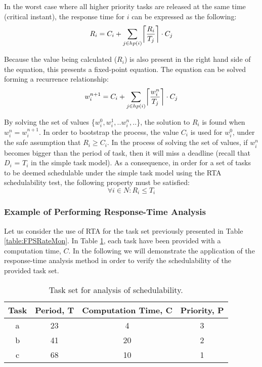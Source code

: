 In the worst case where all higher priority tasks are released at the same time (critical instant), the response time for $i$ can be expressed as the following:
\begin{equation}
	R_i = C_i + \sum_{j\in hp(i)} \ceil[\bigg]{\frac{R_i}{T_j}} \cdot C_j
\end{equation}

Because the value being calculated ($R_i$) is also present in the right hand side of the equation, this presents a fixed-point equation. The equation can be solved forming a recurrence relationship:
\begin{equation}
	\label{eq:recurrence}
	w^{n+1}_{i} = C_i + \sum_{j\in hp(i)} \ceil[\bigg]{\frac{w^n_i}{T_j}} \cdot C_j
\end{equation}

By solving the set of values \{$w^0_i, w^1_i, .. w^n_i, ..$\}, the solution to $R_i$ is found when $w^n_i = w^{n+1}_i$. In order to bootstrap the process, the value $C_i$ is used for $w^0_i$, under the safe assumption that $R_i \ge C_i$. In the process of solving the set of values, if $w^n_i$ becomes bigger than the period of task, then it will miss a deadline (recall that $D_i$ = $T_i$ in the simple task model). As a consequence, in order for a set of tasks to be deemed schedulable under the simple task model using the RTA schedulability test, the following property must be satisfied:
\begin{equation}
	\forall i \in N: R_i \le T_i
\end{equation}

\subsubsection{Example of Performing Response-Time Analysis}
Let us consider the use of RTA for the task set previously presented in Table \ref{table:FPSRateMon}. In Table \ref{table:FPSRateMonSecond}, each task have been provided with a computation time, $C$. In the following we will demonstrate the application of the response-time analysis method in order to verify the schedulability of the provided task set.
	\begin{table}[!ht]
		\centering
		\begin{tabular}{c c c c}
		\hline
		Task & Period, T & Computation Time, C & Priority, P \\ [0.5ex]
		\hline 
		a & 23 & 4 &  3 \\
		b & 41 & 20 &  2 \\
		c & 68 & 10 &  1 \\ [1ex]
		\hline
		\end{tabular}
		\caption{Task set for analysis of schedulability.}
		\label{table:FPSRateMonSecond}
	\end{table}

